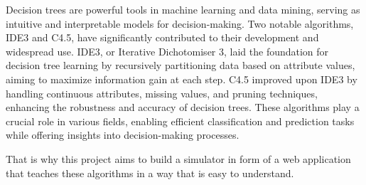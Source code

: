 
Decision trees are powerful tools in machine learning and data mining, serving as intuitive and interpretable models for decision-making. Two notable algorithms, IDE3 and C4.5, have significantly contributed to their development and widespread use. IDE3, or Iterative Dichotomiser 3, laid the foundation for decision tree learning by recursively partitioning data based on attribute values, aiming to maximize information gain at each step. C4.5 improved upon IDE3 by handling continuous attributes, missing values, and pruning techniques, enhancing the robustness and accuracy of decision trees. These algorithms play a crucial role in various fields, enabling efficient classification and prediction tasks while offering insights into decision-making processes.

That is why this project aims to build a simulator in form of a web application that teaches these algorithms in a way that is easy to understand.

